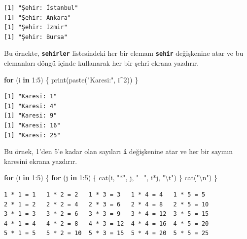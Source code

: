 \documentclass[
  letterpaper,
  DIV=11,
  numbers=noendperiod]{scrreprt}
\newenvironment{Shaded}{\begin{snugshade}}{\end{snugshade}}
\newcommand{\ControlFlowTok}[1]{\textcolor[rgb]{0.00,0.23,0.31}{\textbf{#1}}}
\newcommand{\DecValTok}[1]{\textcolor[rgb]{0.68,0.00,0.00}{#1}}
\newcommand{\FunctionTok}[1]{\textcolor[rgb]{0.28,0.35,0.67}{#1}}
\newcommand{\NormalTok}[1]{\textcolor[rgb]{0.00,0.23,0.31}{#1}}
\newcommand{\SpecialCharTok}[1]{\textcolor[rgb]{0.37,0.37,0.37}{#1}}
\newcommand{\StringTok}[1]{\textcolor[rgb]{0.13,0.47,0.30}{#1}}
\begin{document}
\begin{verbatim}
[1] "Şehir: İstanbul"
[1] "Şehir: Ankara"
[1] "Şehir: İzmir"
[1] "Şehir: Bursa"
\end{verbatim}

Bu örnekte, \textbf{\texttt{sehirler}} listesindeki her bir elemanı
\textbf{\texttt{sehir}} değişkenine atar ve bu elemanları döngü içinde
kullanarak her bir şehri ekrana yazdırır.

\begin{Shaded}
\begin{Highlighting}[]
\ControlFlowTok{for}\NormalTok{ (i }\ControlFlowTok{in} \DecValTok{1}\SpecialCharTok{:}\DecValTok{5}\NormalTok{) \{}
  \FunctionTok{print}\NormalTok{(}\FunctionTok{paste}\NormalTok{(}\StringTok{"Karesi:"}\NormalTok{, i}\SpecialCharTok{\^{}}\DecValTok{2}\NormalTok{))}
\NormalTok{\}}
\end{Highlighting}
\end{Shaded}

\begin{verbatim}
[1] "Karesi: 1"
[1] "Karesi: 4"
[1] "Karesi: 9"
[1] "Karesi: 16"
[1] "Karesi: 25"
\end{verbatim}

Bu örnek, 1'den 5'e kadar olan sayıları \textbf{\texttt{i}} değişkenine
atar ve her bir sayının karesini ekrana yazdırır.

\begin{Shaded}
\begin{Highlighting}[]
\ControlFlowTok{for}\NormalTok{ (i }\ControlFlowTok{in} \DecValTok{1}\SpecialCharTok{:}\DecValTok{5}\NormalTok{) \{}
  \ControlFlowTok{for}\NormalTok{ (j }\ControlFlowTok{in} \DecValTok{1}\SpecialCharTok{:}\DecValTok{5}\NormalTok{) \{}
    \FunctionTok{cat}\NormalTok{(i, }\StringTok{"*"}\NormalTok{, j, }\StringTok{"="}\NormalTok{, i}\SpecialCharTok{*}\NormalTok{j, }\StringTok{"}\SpecialCharTok{\textbackslash{}t}\StringTok{"}\NormalTok{)}
\NormalTok{  \}}
  \FunctionTok{cat}\NormalTok{(}\StringTok{"}\SpecialCharTok{\textbackslash{}n}\StringTok{"}\NormalTok{)}
\NormalTok{\}}
\end{Highlighting}
\end{Shaded}

\begin{verbatim}
1 * 1 = 1   1 * 2 = 2   1 * 3 = 3   1 * 4 = 4   1 * 5 = 5   
2 * 1 = 2   2 * 2 = 4   2 * 3 = 6   2 * 4 = 8   2 * 5 = 10  
3 * 1 = 3   3 * 2 = 6   3 * 3 = 9   3 * 4 = 12  3 * 5 = 15  
4 * 1 = 4   4 * 2 = 8   4 * 3 = 12  4 * 4 = 16  4 * 5 = 20  
5 * 1 = 5   5 * 2 = 10  5 * 3 = 15  5 * 4 = 20  5 * 5 = 25  
\end{verbatim}
\end{document}

